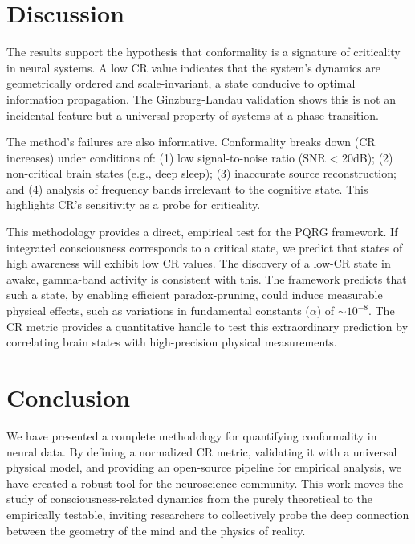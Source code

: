 \documentclass[12pt, reqno]{amsart}
\theoremstyle{definition}
\theoremstyle{remark}
\numberwithin{equation}{section}
\begin{document}
\section{Discussion}
The results support the hypothesis that conformality is a signature of criticality in neural systems. A low CR value indicates that the system's dynamics are geometrically ordered and scale-invariant, a state conducive to optimal information propagation. The Ginzburg-Landau validation shows this is not an incidental feature but a universal property of systems at a phase transition.

The method's failures are also informative. Conformality breaks down (CR increases) under conditions of: (1) low signal-to-noise ratio (SNR < 20dB); (2) non-critical brain states (e.g., deep sleep); (3) inaccurate source reconstruction; and (4) analysis of frequency bands irrelevant to the cognitive state. This highlights CR's sensitivity as a probe for criticality.

This methodology provides a direct, empirical test for the PQRG framework. If integrated consciousness corresponds to a critical state, we predict that states of high awareness will exhibit low CR values. The discovery of a low-CR state in awake, gamma-band activity is consistent with this. The framework predicts that such a state, by enabling efficient paradox-pruning, could induce measurable physical effects, such as variations in fundamental constants ($\alpha$) of $\sim10^{-8}$. The CR metric provides a quantitative handle to test this extraordinary prediction by correlating brain states with high-precision physical measurements.

\section{Conclusion}
We have presented a complete methodology for quantifying conformality in neural data. By defining a normalized CR metric, validating it with a universal physical model, and providing an open-source pipeline for empirical analysis, we have created a robust tool for the neuroscience community. This work moves the study of consciousness-related dynamics from the purely theoretical to the empirically testable, inviting researchers to collectively probe the deep connection between the geometry of the mind and the physics of reality.
\end{document}
